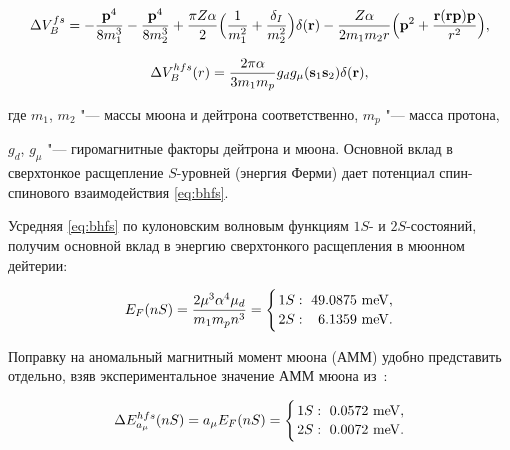 \begin{equation}

\Delta V_B^{fs}=-\frac{{\bf p}^4}{8m_1^3}-\frac{{\bf p}^4}{8m_2^3}+\frac{\pi Z\alpha}{2}

\Bigl(\frac{1}{m_1^2}+\frac{\delta_I}{m_2^2}\Bigr)\delta({\bf r})-\frac{Z\alpha}{2m_1m_2r}

\Bigl({\bf p}^2+\frac{{\bf r}({\bf r}{\bf p}){\bf p}}{r^2}\Bigr),

\end{equation}

\begin{equation}

\label{eq:bhfs}

\Delta V^{hfs}_B(r)=\frac{2\pi\alpha}{3m_1 m_p}g_dg_\mu({\bf s}_1{\bf s}_2)\delta({\bf r}),

\end{equation}

где $m_1$, $m_2$ "--- массы мюона и дейтрона соответственно, $m_p$ "--- масса протона,

$g_d$, $g_\mu$ "--- гиромагнитные факторы дейтрона и мюона. Основной вклад в сверхтонкое расщепление $S$-уровней (энергия Ферми) дает потенциал спин-спинового взаимодействия \eqref{eq:bhfs}. 

Усредняя \eqref{eq:bhfs} по кулоновским волновым функциям $1S$- и $2S$-состояний, получим основной вклад в энергию сверхтонкого расщепления в мюонном дейтерии:

\begin{equation}

\label{eq:hfs}

E_F(nS)=\frac{2\mu^3 \alpha^4\mu_d}{m_1m_pn^3}=

\Biggl\{{{1S:~49.0875~\rm meV,}\atop{2S:~\phantom{1}6.1359~\rm meV.}}

\end{equation}



Поправку на аномальный магнитный момент мюона (АММ) удобно представить отдельно, взяв экспериментальное значение АММ мюона из~\cite{MT}:

\begin{equation}

\label{eq:amm}

\Delta E^{hfs}_{a_\mu}(nS)=a_\mu E_F(nS)=

\Biggl\{{{1S:~0.0572~\rm meV,}\atop{2S:~0.0072~\rm meV.}}

\end{equation}

